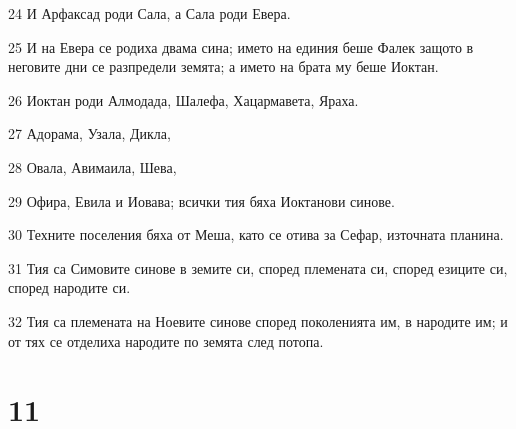 \par 24 И Арфаксад роди Сала, а Сала роди Евера.
\par 25 И на Евера се родиха двама сина; името на единия беше Фалек защото в неговите дни се разпредели земята; а името на брата му беше Иоктан.
\par 26 Иоктан роди Алмодада, Шалефа, Хацармавета, Яраха.
\par 27 Адорама, Узала, Дикла,
\par 28 Овала, Авимаила, Шева,
\par 29 Офира, Евила и Иовава; всички тия бяха Иоктанови синове.
\par 30 Техните поселения бяха от Меша, като се отива за Сефар, източната планина.
\par 31 Тия са Симовите синове в земите си, според племената си, според езиците си, според народите си.
\par 32 Тия са племената на Ноевите синове според поколенията им, в народите им; и от тях се отделиха народите по земята след потопа.

\chapter{11}

